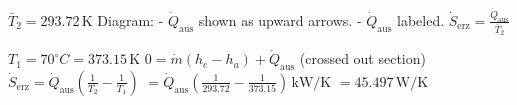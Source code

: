 \( \bar{T}_2 = 293.72 \, \text{K} \)  
Diagram:  
- \( \dot{Q}_{\text{aus}} \) shown as upward arrows.  
- \( \dot{Q}_{\text{aus}} \) labeled.  
\( \dot{S}_{\text{erz}} = \frac{\dot{Q}_{\text{aus}}}{\bar{T}_2} \)  

\( T_1 = 70^\circ C = 373.15 \, \text{K} \)  
\( 0 = \dot{m} (h_e - h_a) + \dot{Q}_{\text{aus}} \) (crossed out section)  
\( \dot{S}_{\text{erz}} = \dot{Q}_{\text{aus}} \left( \frac{1}{T_2} - \frac{1}{T_1} \right) \)  
\( = \dot{Q}_{\text{aus}} \left( \frac{1}{293.72} - \frac{1}{373.15} \right) \, \text{kW/K} \)  
\( = 45.497 \, \text{W/K} \)